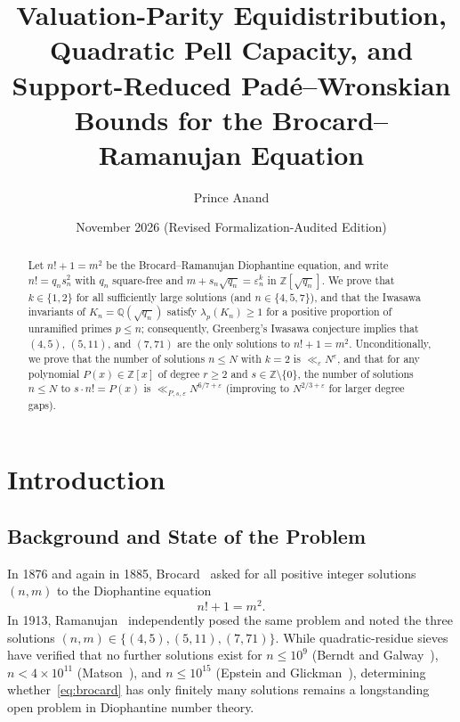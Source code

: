 \documentclass[11pt,reqno]{amsart}
\title[Brocard--Ramanujan Equation: Valuation Parity, Pell Capacity, and Pad\'e--Wronskian Bounds]{%
  Valuation-Parity Equidistribution, Quadratic Pell Capacity, and Support-Reduced Pad\'e--Wronskian Bounds for the Brocard--Ramanujan Equation}
\author{Prince Anand}
\date{November 2026 (Revised Formalization-Audited Edition)}
\theoremstyle{remark}
\newcommand{\Z}{\mathbb{Z}}
\newcommand{\Q}{\mathbb{Q}}
\begin{document}
\begin{abstract}
Let $n! + 1 = m^2$ be the Brocard--Ramanujan Diophantine equation, and write $n! = q_n s_n^2$ with $q_n$ square-free and $m + s_n\sqrt{q_n} = \varepsilon_n^k$ in $\Z[\sqrt{q_n}]$. We prove that $k \in \{1, 2\}$ for all sufficiently large solutions (and $n \in \{4, 5, 7\}$), and that the Iwasawa invariants of $K_n = \Q(\sqrt{q_n})$ satisfy $\lambda_p(K_n) \ge 1$ for a positive proportion of unramified primes $p \le n$; consequently, Greenberg's Iwasawa conjecture implies that $(4, 5)$, $(5, 11)$, and $(7, 71)$ are the only solutions to $n! + 1 = m^2$. Unconditionally, we prove that the number of solutions $n \le N$ with $k = 2$ is $\ll_\varepsilon N^\varepsilon$, and that for any polynomial $P(x) \in \Z[x]$ of degree $r \ge 2$ and $s \in \Z \setminus \{0\}$, the number of solutions $n \le N$ to $s \cdot n! = P(x)$ is $\ll_{P,s,\varepsilon} N^{6/7+\varepsilon}$ (improving to $N^{2/3+\varepsilon}$ for larger degree gaps).
\end{abstract}

\maketitle

\section{Introduction}

\subsection{Background and State of the Problem}
In 1876 and again in 1885, Brocard~\cite{Brocard1876,Brocard1885} asked for all positive integer solutions $(n, m)$ to the Diophantine equation
\begin{equation}\label{eq:brocard}
n! + 1 = m^2.
\end{equation}
In 1913, Ramanujan~\cite{Ramanujan1913} independently posed the same problem and noted the three solutions $(n, m) \in \{(4, 5), (5, 11), (7, 71)\}$. While quadratic-residue sieves have verified that no further solutions exist for $n \le 10^9$ (Berndt and Galway~\cite{BerndtGalway2000}), $n < 4 \times 10^{11}$ (Matson~\cite{Matson2017}), and $n \le 10^{15}$ (Epstein and Glickman~\cite{EpsteinGlickman2020}), determining whether~\eqref{eq:brocard} has only finitely many solutions remains a longstanding open problem in Diophantine number theory.
\end{document}
